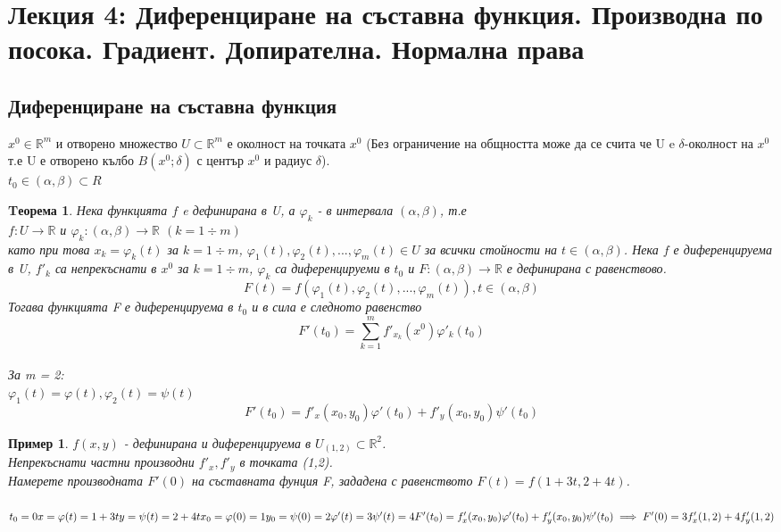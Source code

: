 \documentclass[fleqn,12pt]{article}
\newtheorem{theorem}{Tеорема}[subsection]
\newtheorem{example}{Пример}[subsection]
\begin{document}
\newpage

\section{Лекция 4: Диференциране на съставна функция. Производна по посока. Градиент. Допирателна. Нормална права}

\subsection{Диференциране на съставна функция}
$x^0 \in \mathbb{R}^m$ и отворено множество $U \subset \mathbb{R}^m$ е околност на точката $x^0$ (Без ограничение на общността може да се счита че U e $\delta$-околност на $x^0$ т.е U е отворено кълбо $B(x^0;\delta)$ с център $x^0$ и радиус $\delta$). \\
$t_0 \in (\alpha, \beta) \subset R$

\begin{theorem}
Нека функцията $f$ e дефинирана в U, а $\varphi_k$ - в интервала $(\alpha, \beta)$, т.е \\
$f: U \to \mathbb{R}$ и $\varphi_k: (\alpha, \beta)  \to \mathbb{R} $ $ (k = 1 \div m)$\\
като при това $x_k = \varphi_k(t)$ за $ k = 1 \div m $, $ \varphi_1(t),  \varphi_2(t), ...,  \varphi_m(t) \in U$ за всички стойности на $t \in (\alpha, \beta)$. Нека $f$ е диференцируема в U, $f'_k$ са непрекъснати в $x^0$ за $ k = 1 \div m$, $\varphi_k$ са диференцируеми в $t_0$ и $F: (\alpha, \beta)  \to \mathbb{R}$ е дефинирана с равенствово. \\
$$F(t) = f(\varphi_1(t),  \varphi_2(t), ...,  \varphi_m(t)), t \in (\alpha, \beta)$$
Тогава функцията F е диференцируема в $t_0$ и в сила е следното равенство
$$F'(t_0) = \sum_{k =1}^m f'_{x_k}(x^0)\varphi '_k (t_0)$$ \\
За m = 2: \\
$\varphi_1(t) = \varphi(t) , \varphi_2(t) =\psi(t) $
$$F'(t_0) = f'_x(x_0, y_0)\varphi'(t_0) + f'_y(x_0, y_0)\psi'(t_0)$$
\end{theorem}

\begin{example}
$f(x,y)$ - дефинирана и диференцируема в $U_{(1,2)} \subset \mathbb{R}^2$.\\
Непрекъснати частни производни $f'_x, f'_y$ в точката (1,2). \\
Намерете производната $F'(0)$ на съставната фунция F, зададена с равенството $F(t) = f(1+3t, 2+4t)$. \\
\\
$
t_0 = 0 \\
x = \varphi(t) = 1+3t \\
y = \psi(t) = 2 + 4t \\
x_0 = \varphi(0) = 1 \\
y_0 = \psi(0) = 2 \\
\varphi'(t) = 3 \\
\psi'(t) = 4 \\
F'(t_0) = f'_x(x_0, y_0)\varphi'(t_0) + f'_y(x_0, y_0)\psi'(t_0) \implies  F'(0) = 3f'_x(1,2) + 4f'_y(1,2)
$
\end{example}
\end{document}
